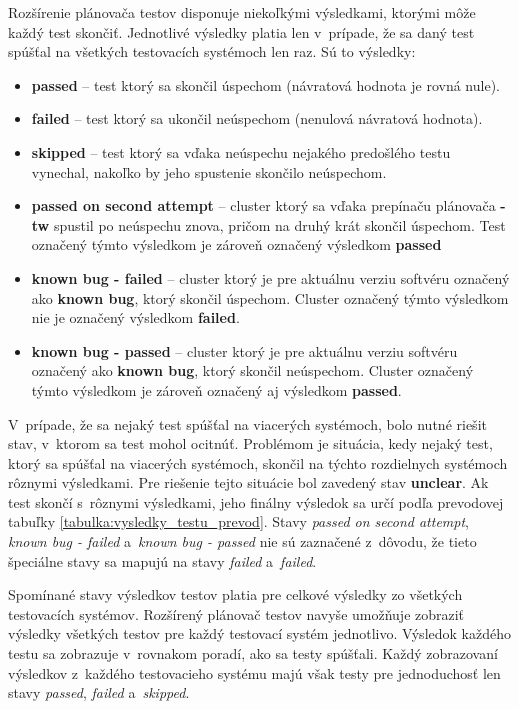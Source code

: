 Rozšírenie plánovača testov disponuje niekoľkými výsledkami, ktorými môže každý test skončiť. 
Jednotlivé výsledky platia len v~prípade, že sa daný test spúšťal na všetkých testovacích systémoch len raz. Sú to výsledky:
\begin{itemize}
\item \textbf{passed} -- test ktorý sa skončil úspechom (návratová hodnota je rovná nule).
\item \textbf{failed} -- test ktorý sa ukončil neúspechom (nenulová návratová hodnota).
\item \textbf{skipped} -- test ktorý sa vďaka neúspechu nejakého predošlého testu vynechal, nakoľko by jeho spustenie skončilo neúspechom.
\item \textbf{passed on second attempt} -- cluster ktorý sa vďaka prepínaču plánovača \textbf{-tw} spustil po neúspechu znova, pričom na druhý
krát skončil úspechom. Test označený týmto výsledkom je zároveň označený výsledkom \textbf{passed}
\item \textbf{known bug - failed} -- cluster ktorý je pre aktuálnu verziu softvéru označený ako \textbf{known bug}, ktorý skončil úspechom. 
Cluster označený týmto výsledkom nie je označený výsledkom \textbf{failed}.
\item \textbf{known bug - passed} -- cluster ktorý je pre aktuálnu verziu softvéru označený ako \textbf{known bug}, ktorý skončil neúspechom.
Cluster označený týmto výsledkom je zároveň označený aj výsledkom \textbf{passed}.
\end{itemize} 

V~prípade, že sa nejaký test spúšťal na viacerých systémoch, bolo nutné riešit stav, v~ktorom sa test mohol ocitnúť. 
Problémom je situácia, kedy nejaký test, ktorý sa spúšťal na viacerých systémoch, skončil na týchto rozdielnych systémoch rôznymi výsledkami.
Pre riešenie tejto situácie bol zavedený stav \textbf{unclear}. 
Ak test skončí s~rôznymi výsledkami, jeho finálny výsledok sa určí podľa prevodovej tabuľky \ref{tabulka:vysledky_testu_prevod}.
Stavy \emph{passed on second attempt}, \emph{known bug - failed}
a~\emph{known bug - passed} nie sú zaznačené z~dôvodu, že tieto špeciálne stavy sa mapujú na stavy \emph{failed} a~\emph{failed}.

Spomínané stavy výsledkov testov platia pre celkové výsledky zo všetkých testovacích systémov. Rozšírený plánovač testov navyše umožňuje zobraziť 
výsledky všetkých testov pre každý testovací systém jednotlivo. Výsledok každého testu sa zobrazuje v~rovnakom poradí, ako sa testy spúšťali.
Každý zobrazovaní výsledkov z~každého testovacieho systému majú však testy pre jednoduchosť len stavy \emph{passed}, \emph{failed} a~\emph{skipped}. 

